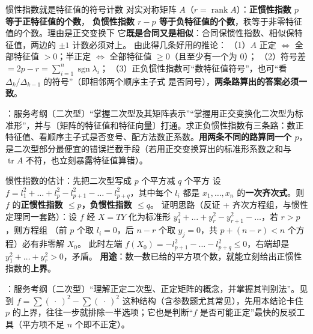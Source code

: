 \begin{fdeep}{惯性指数就是特征值的符号计数}
对实对称矩阵 $A$（$r=\operatorname{rank}A$）：\textbf{正惯性指数 $p$ 等于正特征值的个数}，
\textbf{负惯性指数 $r-p$ 等于负特征值的个数}，秩等于非零特征值的个数。理由是正交变换下
它\textbf{既是合同又是相似}：合同保惯性指数、相似保特征值，两边的 $\pm1$ 计数必须对上。
由此得几条好用的推论：
（1）$A$ 正定 $\iff$ 全部特征值 $>0$；半正定 $\iff$ 全部特征值 $\ge0$（且至少有一个为 $0$）；
（2）符号差 $=2p-r=\sum_{i=1}^{n}\operatorname{sgn}\lambda_i$；
（3）正负惯性指数可“数特征值符号”，也可“看 $\Delta_k/\Delta_{k-1}$ 的符号”（即相邻两个顺序主子式
是否同号），\textbf{两条路算出的答案必须一致}。

\fbref{}：服务考纲〔二次型〕“掌握二次型及其矩阵表示”“掌握用正交变换化二次型为标准形”，并与〔矩阵的特征值和特征向量〕打通。求正负惯性指数有三条路：数正特征值、看顺序主子式是否变号、配方法数正系数。\textbf{用两条不同的路算同一个 $p$}，是二次型部分最便宜的错误拦截手段（若用正交变换算出的标准形系数之和与 $\operatorname{tr}A$ 不符，也立刻暴露特征值算错）。
\end{fdeep}

\begin{fdeep}{惯性指数的估计：先把二次型写成 $p$ 个平方减 $q$ 个平方}
设 $f=l_1^{2}+\dots+l_p^{2}-l_{p+1}^{2}-\dots-l_{p+q}^{2}$，其中每个 $l_i$ 都是
$x_1,\dots,x_n$ 的\textbf{一次齐次式}。则 $f$ 的\textbf{正惯性指数 $\le p$，负惯性指数 $\le q$}。
证明思路（反证 + 齐次方程组，与惯性定理同一套路）：设 $f$ 经 $X=TY$ 化为标准形
$y_1^{2}+\dots+y_r^{2}-y_{r+1}^{2}-\dots$，若 $r>p$，则方程组
（前 $p$ 个取 $l_i=0$，后 $n-r$ 个取 $y_j=0$，共 $p+(n-r)<n$ 个方程）必有非零解 $X_0$。
此时左端 $f(X_0)=-l_{p+1}^{2}-\dots-l_{p+q}^{2}\le0$，右端却是 $y_1^{2}+\dots+y_r^{2}>0$，矛盾。
\textbf{用途}：数一数已给的平方项个数，就能立刻给出正惯性指数的\textbf{上界}。

\fbref{}：服务考纲〔二次型〕“理解正定二次型、正定矩阵的概念，并掌握其判别法”。见到 $f=\sum(\ \cdot\ )^{2}-\sum(\ \cdot\ )^{2}$ 这种结构（含参数题尤其常见），先用本结论卡住 $p$ 的上界，往往一步就排除一半选项；它也是判断“$f$ 是否可能正定”最快的反驳工具（平方项不足 $n$ 个即不正定）。
\end{fdeep}

